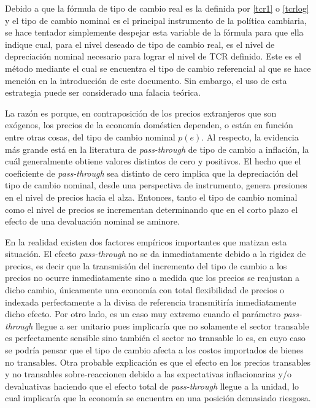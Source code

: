 \documentclass[12pt,letterpaper]{article}
\begin{document}
Debido a que la fórmula de tipo de cambio real es la definida por \ref{tcr1} o \ref{tcrlog} y el tipo de cambio nominal es el principal instrumento de la política cambiaria, se hace tentador simplemente despejar esta variable de la fórmula para que ella indique cual, para el nivel deseado de tipo de cambio real, es el nivel de depreciación nominal necesario para lograr el nivel de TCR definido. Este es el método mediante el cual se encuentra el tipo de cambio referencial al que se hace mención en la introducción de este documento. Sin embargo, el uso de esta estrategia puede ser considerado una falacia teórica.

La razón es porque, en contraposición de los precios extranjeros que son exógenos, los precios de la economía doméstica dependen, o están en función entre otras cosas, del tipo de cambio nominal $p(e)$. Al respecto, la evidencia más grande está en la literatura de \emph{pass-through} de tipo de cambio a inflación, la cuál generalmente obtiene valores distintos de cero y positivos. El hecho que el coeficiente de \emph{pass-through} sea distinto de cero implica que la depreciación del tipo de cambio nominal, desde una perspectiva de instrumento, genera presiones en el nivel de precios hacia el alza. Entonces, tanto el tipo de cambio nominal como el nivel de precios se incrementan determinando que en el corto plazo el efecto de una devaluación nominal se aminore.

En la realidad existen dos factores empíricos importantes que matizan esta situación. El efecto \emph{pass-through} no se da inmediatamente debido a la rigidez de precios, es decir que la transmisión del incremento del tipo de cambio a los precios no ocurre inmediatamente sino a medida que los precios se reajustan a dicho cambio, únicamente una economía con total flexibilidad de precios o indexada perfectamente a la divisa de referencia transmitiría inmediatamente dicho efecto. Por otro lado, es un caso muy extremo cuando el parámetro \emph{pass-through} llegue a ser unitario pues implicaría que no solamente el sector transable es perfectamente sensible sino también el sector no transable lo es, en cuyo caso se podría pensar que el tipo de cambio afecta a los costos importados de bienes no transables. Otra probable explicación es que el efecto en los precios transables y no transables sobre-reaccionen debido a las expectativas inflacionarias y/o devaluativas haciendo que el efecto total de \emph{pass-through} llegue a la unidad, lo cual implicaría que la economía se encuentra en una posición demasiado riesgosa.
\end{document}
